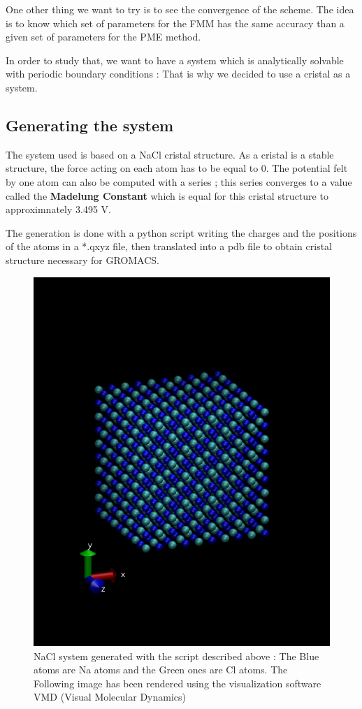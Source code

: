 \documentclass[12pt,twoside,a4paper]{report}
\begin{document}
One other thing we want to try is to see the convergence of the scheme. The idea is to know which set of parameters for the FMM has the same accuracy than a given set of parameters for the PME method. 

In order to study that, we want to have a system which is analytically solvable with periodic boundary conditions : That is why we decided to use a cristal as a system. 

\subsection{Generating the system}

The system used is based on a NaCl cristal structure. As a cristal is a stable structure, the force acting on each atom has to be equal to 0. The potential felt by one atom can also be computed with a series ; this series converges to a value called the \textbf{Madelung Constant} which is equal for this cristal structure to approximnately 3.495 V.

The generation is done with a python script writing the charges and the positions of the atoms in a *.qxyz file, then translated into a pdb file to obtain cristal structure necessary for GROMACS.

\begin{figure}[H]
	   \includegraphics[scale=0.4]{nacl}
    \centering 
    \caption{NaCl system generated with the script described above : The Blue atoms are Na atoms and the Green ones are Cl atoms. The Following image has been rendered using the visualization software VMD (Visual Molecular Dynamics)}    
   \end{figure}  
\end{document}
